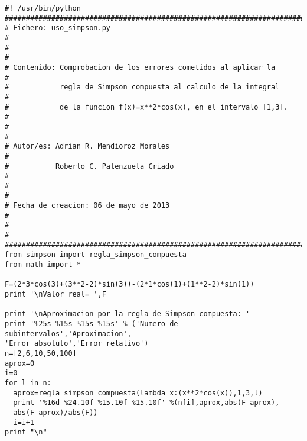 \begin{center}
\begin{footnotesize}
\begin{verbatim}
#! /usr/bin/python
########################################################################
# Fichero: uso_simpson.py                                             #
#                                                                     #
# Contenido: Comprobacion de los errores cometidos al aplicar la      #
#            regla de Simpson compuesta al calculo de la integral     #
#            de la funcion f(x)=x**2*cos(x), en el intervalo [1,3].   #
#                                                                     #
# Autor/es: Adrian R. Mendioroz Morales                               #
#           Roberto C. Palenzuela Criado                              #
#                                                                     #    
# Fecha de creacion: 06 de mayo de 2013                               # 
#                                                                     #      
########################################################################
from simpson import regla_simpson_compuesta
from math import *

F=(2*3*cos(3)+(3**2-2)*sin(3))-(2*1*cos(1)+(1**2-2)*sin(1))
print '\nValor real= ',F

print '\nAproximacion por la regla de Simpson compuesta: '
print '%25s %15s %15s %15s' % ('Numero de subintervalos','Aproximacion',
'Error absoluto','Error relativo')
n=[2,6,10,50,100]
aprox=0
i=0
for l in n:
  aprox=regla_simpson_compuesta(lambda x:(x**2*cos(x)),1,3,l)
  print '%16d %24.10f %15.10f %15.10f' %(n[i],aprox,abs(F-aprox),
  abs(F-aprox)/abs(F))
  i=i+1
print "\n"
\end{verbatim}
\end{footnotesize}
\end{center}